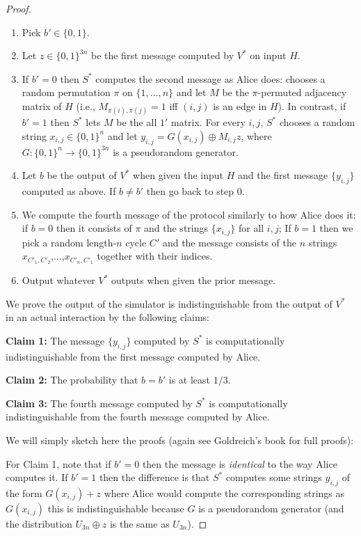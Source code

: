 \begin{proof}
\begin{enumerate}
\def\labelenumi{\arabic{enumi}.}
\setcounter{enumi}{-1}
\item
  Pick \(b'\in\{0,1\}\).
\item
  Let \(z\in \{0,1\}^{3n}\) be the first message computed by \(V^*\) on
  input \(H\).
\item
  If \(b'=0\) then \(S^*\) computes the second message as Alice does:
  chooses a random permutation \(\pi\) on \(\{1,\ldots, n\}\) and let
  \(M\) be the \(\pi\)-permuted adjacency matrix of \(H\) (i.e.,
  \(M_{\pi(i),\pi(j)}=1\) iff \((i,j)\) is an edge in \(H\)). In
  contrast, if \(b'=1\) then \(S^*\) lets \(M\) be the all \(1'\)
  matrix. For every \(i,j\), \(S^*\) chooses a random string
  \(x_{i,j} \in \{0,1\}^n\) and let
  \(y_{i,j}=G(x_{i,j})\oplus M_{i,j}z\), where
  \(G:\{0,1\}^n\rightarrow\{0,1\}^{3n}\) is a pseudorandom generator.
\item
  Let \(b\) be the output of \(V^*\) when given the input \(H\) and the
  first message \(\{ y_{i,j} \}\) computed as above. If \(b\neq b'\)
  then go back to step 0.
\item
  We compute the fourth message of the protocol similarly to how Alice
  does it: if \(b=0\) then it consists of \(\pi\) and the strings
  \(\{ x_{i,j} \}\) for all \(i,j\); If \(b=1\) then we pick a random
  length-\(n\) cycle \(C'\) and the message consists of the \(n\)
  strings \(x_{C'_1,C'_2}\),\(\ldots\),\(x_{C'_n,C'_1}\) together with
  their indices.
\item
  Output whatever \(V^*\) outputs when given the prior message.
\end{enumerate}

We prove the output of the simulator is indistinguishable from the
output of \(V^*\) in an actual interaction by the following claims:

\textbf{Claim 1:} The message \(\{ y_{i,j} \}\) computed by \(S^*\) is
computationally indistinguishable from the first message computed by
Alice.

\textbf{Claim 2:} The probability that \(b=b'\) is at least \(1/3\).

\textbf{Claim 3:} The fourth message computed by \(S^*\) is
computationally indistinguishable from the fourth message computed by
Alice.

We will simply sketch here the proofs (again see Goldreich's book for
full proofs):

For Claim 1, note that if \(b'=0\) then the message is \emph{identical}
to the way Alice computes it. If \(b'=1\) then the difference is that
\(S^*\) computes some strings \(y_{i,j}\) of the form \(G(x_{i,j})+z\)
where Alice would compute the corresponding strings as \(G(x_{i,j})\)
this is indistinguishable because \(G\) is a pseudorandom generator (and
the distribution \(U_{3n}\oplus z\) is the same as \(U_{3n}\)).


\end{proof}
